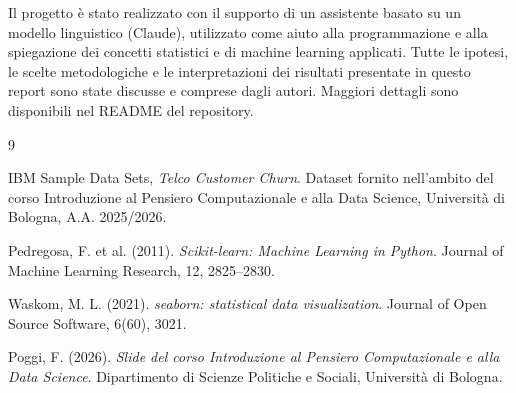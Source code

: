 \documentclass[11pt,a4paper]{article}
\begin{document}
Il progetto \`e stato realizzato con il supporto di un assistente basato su un modello linguistico (Claude), utilizzato come aiuto alla programmazione e alla spiegazione dei concetti statistici e di machine learning applicati. Tutte le ipotesi, le scelte metodologiche e le interpretazioni dei risultati presentate in questo report sono state discusse e comprese dagli autori. Maggiori dettagli sono disponibili nel README del repository.

\begin{thebibliography}{9}

IBM Sample Data Sets, \emph{Telco Customer Churn}. Dataset fornito nell'ambito del corso Introduzione al Pensiero Computazionale e alla Data Science, Universit\`a di Bologna, A.A. 2025/2026.

Pedregosa, F. et al. (2011). \emph{Scikit-learn: Machine Learning in Python}. Journal of Machine Learning Research, 12, 2825--2830.

Waskom, M. L. (2021). \emph{seaborn: statistical data visualization}. Journal of Open Source Software, 6(60), 3021.

Poggi, F. (2026). \emph{Slide del corso Introduzione al Pensiero Computazionale e alla Data Science}. Dipartimento di Scienze Politiche e Sociali, Universit\`a di Bologna.

\end{thebibliography}
\end{document}

